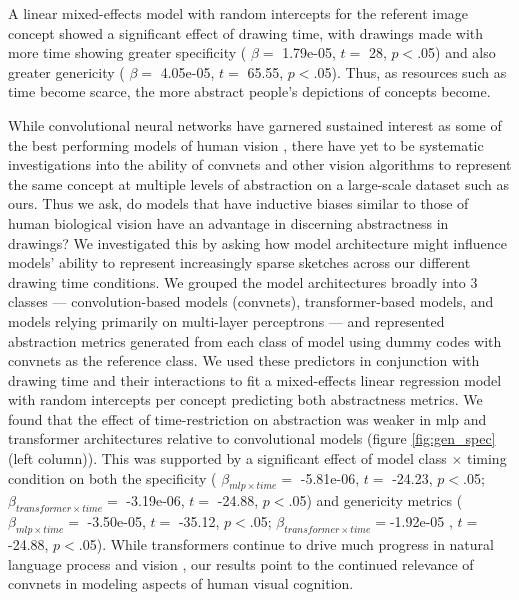 \documentclass[10pt,letterpaper]{article}
\begin{document}
A linear mixed-effects model with random intercepts for the referent image concept showed a significant effect of drawing time, with drawings made with more time showing greater specificity ( $\beta =$ 1.79e-05, $t=$ 28, $p<$.05) and also greater genericity ( $\beta =$ 4.05e-05, $t=$ 65.55, $p<$.05).
Thus, as resources such as time become scarce, the more abstract people's depictions of concepts become.

While convolutional neural networks have garnered sustained interest as some of the best performing models of human vision \cite{yamins2014performance,cadieu2014deep,kriegeskorte2015deep,kietzmann2019recurrence}, there have yet to be systematic investigations into the ability of convnets and other vision algorithms to represent the same concept at multiple levels of abstraction on a large-scale dataset such as ours.
Thus we ask, do models that have inductive biases similar to those of human biological vision have an advantage in discerning abstractness in drawings?
We investigated this by asking how model architecture might influence models' ability to represent increasingly sparse sketches across our different drawing time conditions.
We grouped the model architectures broadly into 3 classes — convolution-based models (convnets), transformer-based models, and models relying primarily on multi-layer perceptrons \cite{tolstikhin2021mlp}— and represented abstraction metrics generated from each class of model using dummy codes with convnets as the reference class. We used these predictors in conjunction with drawing time and their interactions to fit a mixed-effects linear regression model with random intercepts per concept predicting both abstractness metrics.
We found that the effect of time-restriction on abstraction was weaker in mlp and transformer architectures relative to convolutional models (figure \ref{fig:gen_spec} (left column)).
This was supported by a significant effect of model class $\times$ timing condition on both the specificity (
$\beta_{mlp \times time}= $ -5.81e-06, $t =$ -24.23, $p<$.05; $\beta_{transformer \times time}= $ -3.19e-06, $t =$ -24.88, $p<$.05) and genericity metrics (
$\beta_{mlp \times time}= $ -3.50e-05, $t =$ -35.12, $p<$.05; $\beta_{transformer \times time}= $-1.92e-05 , $t =$ -24.88, $p<$.05). While transformers continue to drive much progress in natural language process and vision \cite{chen2021visformer}, our results point to the continued relevance of convnets in modeling aspects of human visual cognition.
\end{document}
